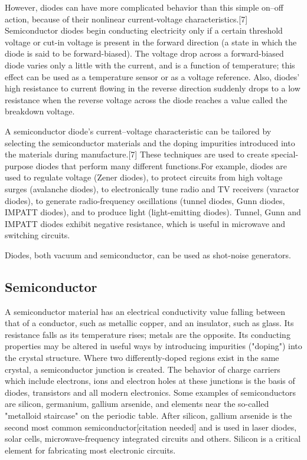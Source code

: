 \documentclass{article}
\begin{document}
However, diodes can have more complicated behavior than this simple on–off action, because of their nonlinear current-voltage characteristics.[7] Semiconductor diodes begin conducting electricity only if a certain threshold voltage or cut-in voltage is present in the forward direction (a state in which the diode is said to be forward-biased). The voltage drop across a forward-biased diode varies only a little with the current, and is a function of temperature; this effect can be used as a temperature sensor or as a voltage reference. Also, diodes' high resistance to current flowing in the reverse direction suddenly drops to a low resistance when the reverse voltage across the diode reaches a value called the breakdown voltage.

A semiconductor diode's current–voltage characteristic can be tailored by selecting the semiconductor materials and the doping impurities introduced into the materials during manufacture.[7] These techniques are used to create special-purpose diodes that perform many different functions.For example, diodes are used to regulate voltage (Zener diodes), to protect circuits from high voltage surges (avalanche diodes), to electronically tune radio and TV receivers (varactor diodes), to generate radio-frequency oscillations (tunnel diodes, Gunn diodes, IMPATT diodes), and to produce light (light-emitting diodes). Tunnel, Gunn and IMPATT diodes exhibit negative resistance, which is useful in microwave and switching circuits.

Diodes, both vacuum and semiconductor, can be used as shot-noise generators.
	\newpage
	\subsection{Semiconductor}
	A semiconductor material has an electrical conductivity value falling between that of a conductor, such as metallic copper, and an insulator, such as glass. Its resistance falls as its temperature rises; metals are the opposite. Its conducting properties may be altered in useful ways by introducing impurities ("doping") into the crystal structure. Where two differently-doped regions exist in the same crystal, a semiconductor junction is created. The behavior of charge carriers which include electrons, ions and electron holes at these junctions is the basis of diodes, transistors and all modern electronics. Some examples of semiconductors are silicon, germanium, gallium arsenide, and elements near the so-called "metalloid staircase" on the periodic table. After silicon, gallium arsenide is the second most common semiconductor[citation needed] and is used in laser diodes, solar cells, microwave-frequency integrated circuits and others. Silicon is a critical element for fabricating most electronic circuits.
\end{document}
